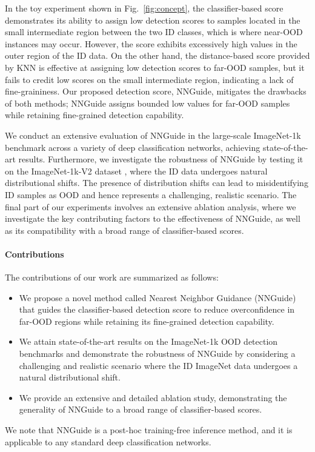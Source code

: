 \documentclass[10pt,twocolumn,letterpaper]{article}
\begin{document}
In the toy experiment shown in Fig.~\ref{fig:concept}, the classifier-based score demonstrates its ability to assign low detection scores to samples located in the small intermediate region between the two ID classes, which is where near-OOD instances may occur. However, the score exhibits excessively high values in the outer region of the ID data. On the other hand, the distance-based score provided by KNN is effective at assigning low detection scores to far-OOD samples, but it fails to credit low scores on the small intermediate region, indicating a lack of fine-graininess. Our proposed detection score, NNGuide, mitigates the drawbacks of both methods; NNGuide assigns bounded low values for far-OOD samples while retaining fine-grained detection capability.


We conduct an extensive evaluation of NNGuide in the large-scale ImageNet-1k benchmark \cite{huang2021mos} across a variety of deep classification networks, achieving state-of-the-art results. 
Furthermore, we investigate the robustness of NNGuide by testing it on the ImageNet-1k-V2 dataset \cite{taori2020measuring,recht2019imagenet}, where the ID data undergoes natural distributional shifts. The presence of distribution shifts can lead to misidentifying ID samples as OOD and hence represents a challenging, realistic scenario.
The final part of our experiments involves an extensive ablation analysis, where we investigate the key contributing factors to the effectiveness of NNGuide, as well as its compatibility with a broad range of classifier-based scores.


\paragraph{Contributions}
The contributions of our work are summarized as follows:
\begin{itemize}
\item We propose a novel method called Nearest Neighbor Guidance (NNGuide) that guides the classifier-based detection score to reduce overconfidence in far-OOD regions while retaining its fine-grained detection capability.

\item 
We attain state-of-the-art results on the ImageNet-1k OOD detection benchmarks and demonstrate the robustness of NNGuide by considering a challenging and realistic scenario where the ID ImageNet data undergoes a natural distributional shift. 

\item
We provide an extensive and detailed ablation study, demonstrating the generality of NNGuide to a broad range of classifier-based scores.
\end{itemize}
We note that NNGuide is a post-hoc training-free inference method, and it is applicable to any standard deep classification networks.
\end{document}
